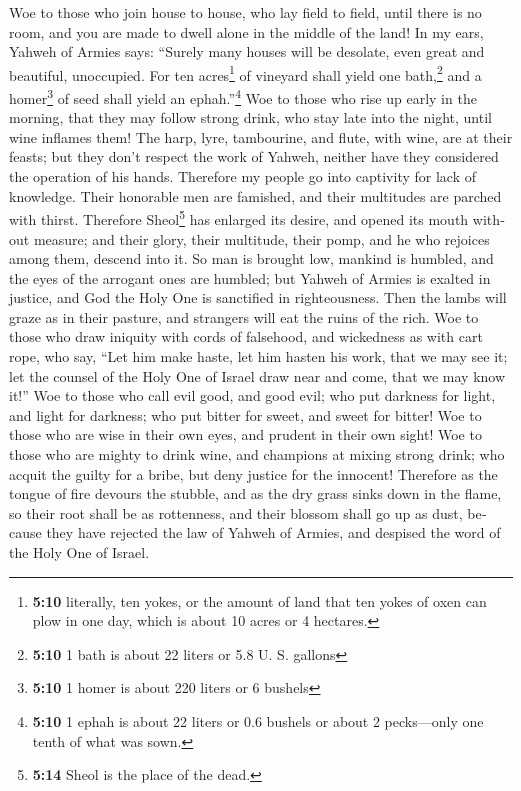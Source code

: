 \begin{paracol}{2}
\begin{otherlanguage}{english}
 Woe to those who join house to house, who lay field to
field, until there is no room, and you are made to dwell alone in the
middle of the land!  In my ears, Yahweh of Armies says:
``Surely many houses will be desolate, even great and beautiful,
unoccupied.  For ten acres\footnote{\textbf{5:10}
  literally, ten yokes, or the amount of land that ten yokes of oxen can
  plow in one day, which is about 10 acres or 4 hectares.} of vineyard
shall yield one bath,\footnote{\textbf{5:10} 1 bath is about 22 liters
  or 5.8 U. S. gallons} and a homer\footnote{\textbf{5:10} 1 homer is
  about 220 liters or 6 bushels} of seed shall yield an
ephah.''\footnote{\textbf{5:10} 1 ephah is about 22 liters or 0.6
  bushels or about 2 pecks---only one tenth of what was sown.}
 Woe to those who rise up early in the morning, that they
may follow strong drink, who stay late into the night, until wine
inflames them!  The harp, lyre, tambourine, and flute,
with wine, are at their feasts; but they don't respect the work of
Yahweh, neither have they considered the operation of his hands.
 Therefore my people go into captivity for lack of
knowledge. Their honorable men are famished, and their multitudes are
parched with thirst.  Therefore Sheol\footnote{\textbf{5:14}
  Sheol is the place of the dead.} has enlarged its desire, and opened
its mouth without measure; and their glory, their multitude, their pomp,
and he who rejoices among them, descend into it.  So man
is brought low, mankind is humbled, and the eyes of the arrogant ones
are humbled;  but Yahweh of Armies is exalted in justice,
and God the Holy One is sanctified in righteousness. 
Then the lambs will graze as in their pasture, and strangers will eat
the ruins of the rich.  Woe to those who draw iniquity
with cords of falsehood, and wickedness as with cart rope,
 who say, ``Let him make haste, let him hasten his work,
that we may see it; let the counsel of the Holy One of Israel draw near
and come, that we may know it!''  Woe to those who call
evil good, and good evil; who put darkness for light, and light for
darkness; who put bitter for sweet, and sweet for bitter!
 Woe to those who are wise in their own eyes, and prudent
in their own sight!  Woe to those who are mighty to drink
wine, and champions at mixing strong drink;  who acquit
the guilty for a bribe, but deny justice for the innocent!
 Therefore as the tongue of fire devours the stubble, and
as the dry grass sinks down in the flame, so their root shall be as
rottenness, and their blossom shall go up as dust, because they have
rejected the law of Yahweh of Armies, and despised the word of the Holy
One of Israel.


\end{otherlanguage}
\end{paracol}
